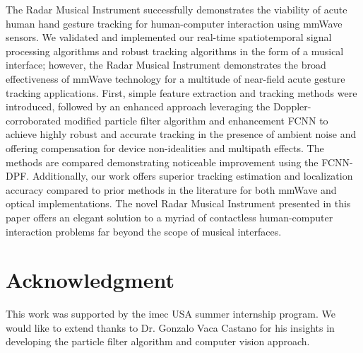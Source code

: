 \documentclass[10pt,journal,final]{IEEEtran}
\begin{document}
The Radar Musical Instrument successfully demonstrates the viability of acute human hand gesture tracking for human-computer interaction using mmWave sensors. We validated and implemented our real-time spatiotemporal signal processing algorithms and robust tracking algorithms in the form of a musical interface; however, the Radar Musical Instrument demonstrates the broad effectiveness of mmWave technology for a multitude of near-field acute gesture tracking applications. First, simple feature extraction and tracking methods were introduced, followed by an enhanced approach leveraging the Doppler-corroborated modified particle filter algorithm and enhancement FCNN to achieve highly robust and accurate tracking in the presence of ambient noise and offering compensation for device non-idealities and multipath effects. The methods are compared demonstrating noticeable improvement using the FCNN-DPF. Additionally, our work offers superior tracking estimation and localization accuracy compared to prior methods in the literature for both mmWave and optical implementations. The novel Radar Musical Instrument presented in this paper offers an elegant solution to a myriad of contactless human-computer interaction problems far beyond the scope of musical interfaces.

\section*{Acknowledgment}
This work was supported by the imec USA summer internship program. We would like to extend thanks to Dr. Gonzalo Vaca Castano for his insights in developing the particle filter algorithm and computer vision approach.



\end{document}

